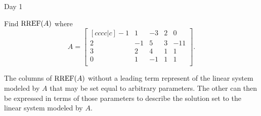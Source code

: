 \begin{applicationActivities}{Day 1}
\begin{activity}{0}
  Find \(\operatorname{RREF}(A)\) where
  \[A=
    \begin{bmatrix}[cccc|c]
      -1 &  1 & -3 &  2 &  0 \\
       2 & -1 &  5 &  3 & -11 \\
       3 &  2 &  4 &  1 &  1 \\
       0 &  1 & -1 &  1 &  1 \\
    \end{bmatrix}
  .\]
\end{activity}

\begin{definition}
  The columns of \(\operatorname{RREF}(A)\) without a leading term represent
   of the linear system modeled by \(A\)
  that may be set equal to arbitrary parameters.
  The other  can then be expressed in terms
  of those parameters to describe the solution set
  to the linear system modeled by \(A\).
\end{definition}


\end{applicationActivities}
